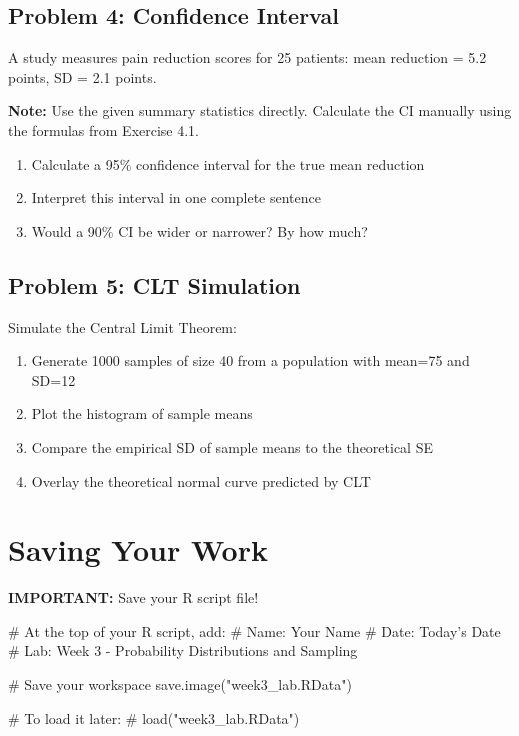 \documentclass[11pt]{article}
\begin{document}
\vspace{2cm}

\subsection{Problem 4: Confidence Interval}

A study measures pain reduction scores for 25 patients: mean reduction = 5.2 points, SD = 2.1 points.

\textbf{Note:} Use the given summary statistics directly. Calculate the CI manually using the formulas from Exercise 4.1.

\begin{enumerate}[label=\alph*)]
\item Calculate a 95\% confidence interval for the true mean reduction
\item Interpret this interval in one complete sentence
\item Would a 90\% CI be wider or narrower? By how much?
\end{enumerate}

\vspace{2cm}

\subsection{Problem 5: CLT Simulation}

Simulate the Central Limit Theorem:

\begin{enumerate}[label=\alph*)]
\item Generate 1000 samples of size 40 from a population with mean=75 and SD=12
\item Plot the histogram of sample means
\item Compare the empirical SD of sample means to the theoretical SE
\item Overlay the theoretical normal curve predicted by CLT
\end{enumerate}

\vspace{2cm}

\section{Saving Your Work}

\textbf{IMPORTANT:} Save your R script file!

\begin{rcode}
# At the top of your R script, add:
# Name: Your Name
# Date: Today's Date
# Lab: Week 3 - Probability Distributions and Sampling

# Save your workspace
save.image("week3_lab.RData")

# To load it later:
# load("week3_lab.RData")
\end{rcode}
\end{document}
